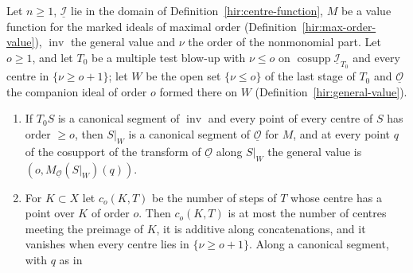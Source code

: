 \begin{lemma}
\label{bcalc:general-companion-phase}
\upstreamleanok
Let \(n\ge1\), \(\underline{\mathcal I}\) lie in the domain of Definition~\ref{hir:centre-function}, \(M\) be a value function for the marked ideals of maximal order
(Definition~\ref{hir:max-order-value}), \(\operatorname{inv}\) the general value and \(\nu\) the order of the nonmonomial part. Let \(o\ge1\), and let \(T_0\) be a multiple
test blow-up with \(\nu\le o\) on \(\operatorname{cosupp}\underline{\mathcal I}_{T_0}\) and every centre in \(\{\nu\ge o+1\}\); let \(W\) be the open set \(\{\nu\le o\}\) of the last
stage of \(T_0\) and \(\underline{\mathcal O}\) the companion ideal of order \(o\) formed there on \(W\) (Definition~\ref{hir:general-value}).
\begin{enumerate}
\item If \(T_0S\) is a canonical segment of \(\operatorname{inv}\) and every point of every centre of \(S\) has order \(\ge o\), then \(S|_W\) is a canonical segment of
\(\underline{\mathcal O}\) for \(M\), and at every point \(q\) of the cosupport of the transform of \(\underline{\mathcal O}\) along \(S|_W\) the general value is
\((o,M_{\underline{\mathcal O}}(S|_W)(q))\).
\item For \(K\subset X\) let \(c_o(K,T)\) be the number of steps of \(T\) whose centre has a point over \(K\) of order \(o\). Then \(c_o(K,T)\) is at most the number of
centres meeting the preimage of \(K\), it is additive along concatenations, and it vanishes when every centre lies in \(\{\nu\ge o+1\}\). Along a canonical segment, with \(q\) as in

\end{enumerate}
\end{lemma}
